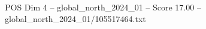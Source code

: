 \begin{textsample}{POS Dim 4 – global\_north\_2024\_01 – Score 17.00 – global\_north\_2024\_01/105517464.txt}
\end{textsample}
